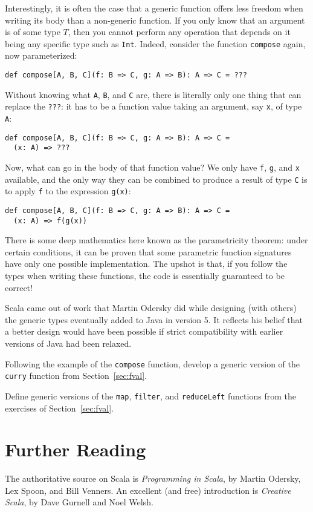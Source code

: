 Interestingly, it is often the case that a generic function offers less freedom when writing its body than a non-generic function. If you only know that an argument is of some type $T$, then you cannot perform any operation that depends on it being any specific type such as \verb|Int|. Indeed, consider the function \verb|compose| again, now parameterized:
\begin{verbatim}
def compose[A, B, C](f: B => C, g: A => B): A => C = ???
\end{verbatim}
Without knowing what \verb|A|, \verb|B|, and \verb|C| are, there is literally only one thing that can replace the \verb|???|: it has to be a function value taking an argument, say \verb|x|, of type \verb|A|:
\begin{verbatim}
def compose[A, B, C](f: B => C, g: A => B): A => C =
  (x: A) => ???
\end{verbatim}
Now, what can go in the body of that function value? We only have \verb|f|, \verb|g|, and \verb|x| available, and the only way they can be combined to produce a result of type \verb|C| is to apply \verb|f| to the expression \verb|g(x)|:
\begin{verbatim}
def compose[A, B, C](f: B => C, g: A => B): A => C =
  (x: A) => f(g(x))
\end{verbatim}
There is some deep mathematics here known as the parametricity theorem: under certain conditions, it can be proven that some parametric function signatures have only one possible implementation. The upshot is that, if you follow the types when writing these functions, the code is essentially guaranteed to be correct!

\begin{tailquote}
Scala came out of work that Martin Odersky did while designing (with others) the generic types eventually added to Java in version 5. It reflects his belief that a better design would have been possible if strict compatibility with earlier versions of Java had been relaxed.
\end{tailquote}
\begin{exercises}
\problem Following the example of the \verb|compose| function, develop a generic version of the \verb|curry| function from Section~\ref{sec:fval}.

\problem Define generic versions of the \texttt{map}, \texttt{filter}, and \texttt{reduceLeft} functions from the exercises of Section~\ref{sec:fval}.
\end{exercises}

\section{Further Reading}
The authoritative source on Scala is \textit{Programming in Scala}, by Martin Odersky, Lex Spoon, and Bill Venners\cite{odersky2016pis}. An excellent (and free) introduction is \textit{Creative Scala}, by Dave Gurnell and Noel Welsh\cite{gurnell2017cs}.

